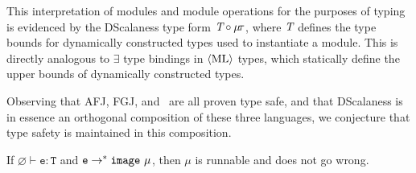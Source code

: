 This interpretation of modules and module operations for the purposes of typing is evidenced by
the DScalaness type form $\textit{T} \circ \mu\!\tau$, where $\textit{T}$ defines the type bounds
for dynamically constructed types used to instantiate a module. This is directly analogous to
$\exists$ type bindings in $\langle \text{ML} \rangle$ types, which statically define the upper bounds of dynamically
constructed types.

Observing that AFJ, FGJ, and \fml\ are all proven type safe, and that DScalaness is in essence an
orthogonal composition of these three languages, we conjecture that type safety is maintained in
this composition.

\begin{conject}
  If $\varnothing \vdash \texttt{e} : \texttt{T}$ and $\texttt{e} \rightarrow^* \mathtt{image}\ \mu$,
  then $\mu$ is runnable and does not go wrong.
\end{conject}

